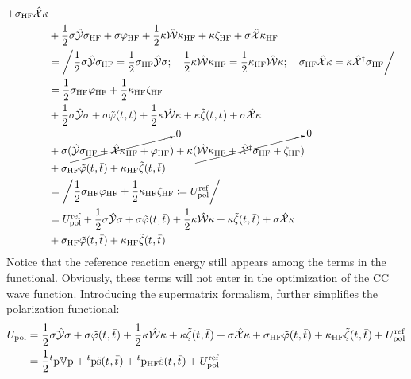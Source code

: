\begin{equation}
\begin{aligned}
  + \sigma_\mathrm{HF}\hat{\mathcal{X}}\kappa \\
&+  \frac{1}{2}\sigma\hat{\mathcal{Y}}\sigma_\mathrm{HF}
  + \sigma\varphi_\mathrm{HF}
  + \frac{1}{2}\kappa\hat{\mathcal{W}}\kappa_\mathrm{HF}
  + \kappa\zeta_\mathrm{HF}
  + \sigma\hat{\mathcal{X}}\kappa_\mathrm{HF} \\
&= \left/
  \frac{1}{2}\sigma\hat{\mathcal{Y}}\sigma_\mathrm{HF}
  =
  \frac{1}{2}\sigma_\mathrm{HF}\hat{\mathcal{Y}}\sigma;\quad
  \frac{1}{2}\kappa\hat{\mathcal{W}}\kappa_\mathrm{HF}
  =
  \frac{1}{2}\kappa_\mathrm{HF}\hat{\mathcal{W}}\kappa; \quad
  \sigma_\mathrm{HF}\hat{\mathcal{X}}\kappa
  =
  \kappa\hat{\mathcal{X}}^\dagger\sigma_\mathrm{HF}
  \right/ \\
&=
    \frac{1}{2}\sigma_\mathrm{HF}\varphi_\mathrm{HF}
  + \frac{1}{2}\kappa_\mathrm{HF}\zeta_\mathrm{HF} \\
&+  \frac{1}{2}\sigma\hat{\mathcal{Y}}\sigma
  + \sigma\tilde{\varphi}(t_{},\bar{t}_{})
  + \frac{1}{2}\kappa\hat{\mathcal{W}}\kappa
  + \kappa\tilde{\zeta}(t_{},\bar{t}_{})
  + \sigma\hat{\mathcal{X}}\kappa \\
  &+ \sigma(\cancelto{0}{\hat{\mathcal{Y}}\sigma_\mathrm{HF} + \hat{\mathcal{X}}\kappa_\mathrm{HF} + \varphi_\mathrm{HF}})
  + \kappa(\cancelto{0}{\hat{\mathcal{W}}\kappa_\mathrm{HF} + \hat{\mathcal{X}}^\dagger\sigma_\mathrm{HF} + \zeta_\mathrm{HF}}) \\
&+ \sigma_\mathrm{HF}\tilde{\varphi}(t_{},\bar{t}_{}) + \kappa_\mathrm{HF}\tilde{\zeta}(t_{},\bar{t}_{}) \\
&= \left/
    \frac{1}{2}\sigma_\mathrm{HF}\varphi_\mathrm{HF}
  + \frac{1}{2}\kappa_\mathrm{HF}\zeta_\mathrm{HF}
  \coloneqq U_\mathrm{pol}^\mathrm{ref}
  \right/ \\
&=
  U_\mathrm{pol}^\mathrm{ref}
  +  \frac{1}{2}\sigma\hat{\mathcal{Y}}\sigma
  + \sigma\tilde{\varphi}(t_{},\bar{t}_{})
  + \frac{1}{2}\kappa\hat{\mathcal{W}}\kappa
  + \kappa\tilde{\zeta}(t_{},\bar{t}_{})
  + \sigma\hat{\mathcal{X}}\kappa \\
&+ \sigma_\mathrm{HF}\tilde{\varphi}(t_{},\bar{t}_{}) + \kappa_\mathrm{HF}\tilde{\zeta}(t_{},\bar{t}_{})
  \end{aligned}
\end{equation}
Notice that the reference reaction energy still appears among the terms
in the functional. Obviously, these terms will not enter in the optimization of
the \acs{CC} wave function.
Introducing the supermatrix formalism, further simplifies the
polarization functional:
\begin{equation}
  \begin{aligned}
  U_\mathrm{pol} &=
    \frac{1}{2}\sigma\hat{\mathcal{Y}}\sigma
    + \sigma\tilde{\varphi}(t_{},\bar{t}_{})
  + \frac{1}{2}\kappa\hat{\mathcal{W}}\kappa
  + \kappa\tilde{\zeta}(t_{},\bar{t}_{})
  + \sigma\hat{\mathcal{X}}\kappa
  + \sigma_\mathrm{HF}\tilde{\varphi}(t_{},\bar{t}_{}) +
  \kappa_\mathrm{HF}\tilde{\zeta}(t_{},\bar{t}_{})
  + U_\mathrm{pol}^\mathrm{ref}
  \\
  &=
  \frac{1}{2}{}^t\mathrm{p}\mathbb{V}\mathrm{p} + {}^t\mathrm{p}\tilde{\mathrm{s}}(t_{},\bar{t}_{})
  + {}^t\mathrm{p}_\mathrm{HF}\tilde{\mathrm{s}}(t_{},\bar{t}_{})
  + U_\mathrm{pol}^\mathrm{ref}
\end{aligned}
\end{equation}


